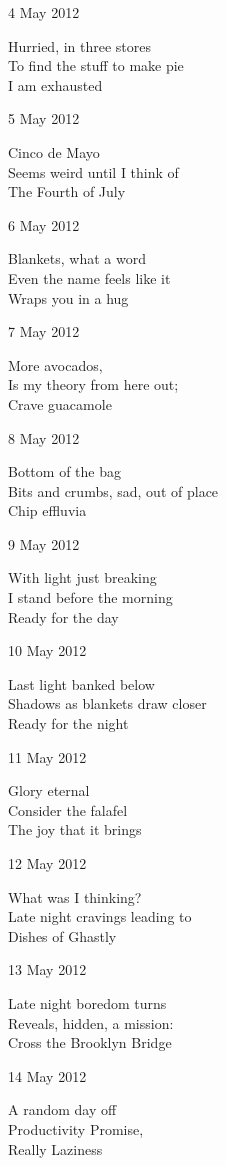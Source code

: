 \documentclass[12pt]{article}
\begin{document}
4 May 2012

Hurried, in three stores \\
To find the stuff to make pie \\
I am exhausted

5 May 2012

Cinco de Mayo \\
Seems weird until I think of \\
The Fourth of July

6 May 2012

Blankets, what a word \\
Even the name feels like it \\
Wraps you in a hug

7 May 2012

More avocados, \\
Is my theory from here out; \\
Crave guacamole

8 May 2012

Bottom of the bag \\
Bits and crumbs, sad, out of place \\
Chip effluvia

9 May 2012

With light just breaking \\
I stand before the morning \\
Ready for the day

10 May 2012

Last light banked below \\
Shadows as blankets draw closer \\
Ready for the night


\newpage

11 May 2012

Glory eternal \\
Consider the falafel \\
The joy that it brings

12 May 2012

What was I thinking? \\
Late night cravings leading to \\
Dishes of Ghastly

13 May 2012

Late night boredom turns \\
Reveals, hidden, a mission: \\
Cross the Brooklyn Bridge

14 May 2012

A random day off \\
Productivity Promise, \\
Really Laziness
\end{document}
